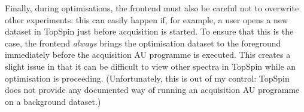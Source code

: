 Finally, during optimisations, the frontend must also be careful not to overwrite other experiments: this can easily happen if, for example, a user opens a new dataset in TopSpin just before acquisition is started.
To ensure that this is the case, the frontend \textit{always} brings the optimisation dataset to the foreground immediately before the acquisition AU programme is executed.
This creates a slight issue in that it can be difficult to view other spectra in TopSpin while an optimisation is proceeding.
(Unfortunately, this is out of my control: TopSpin does not provide any documented way of running an acquisition AU programme on a background dataset.)
